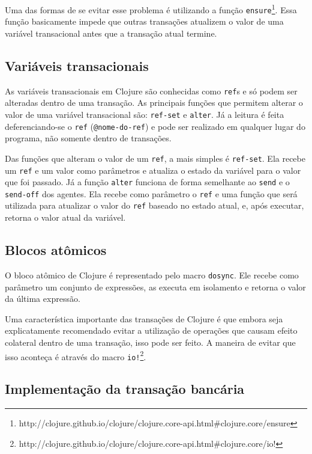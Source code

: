 Uma das formas de se evitar esse problema é utilizando a função \verb|ensure|\footnote{http://clojure.github.io/clojure/clojure.core-api.html\#clojure.core/ensure}. Essa função basicamente impede que outras transações atualizem o valor de uma variável transacional antes que a transação atual termine.


\subsection{Variáveis transacionais}

As variáveis transacionais em Clojure são conhecidas como \verb|ref|s e só podem ser alteradas dentro de uma transação. As principais funções que permitem alterar o valor de uma variável transacional são: \verb|ref-set| e \verb|alter|. Já a leitura é feita deferenciando-se o \verb|ref| (\verb|@nome-do-ref|) e pode ser realizado em qualquer lugar do programa, não somente dentro de transações.

Das funções que alteram o valor de um \verb|ref|, a mais simples é \verb|ref-set|. Ela recebe um \verb|ref| e um valor como parâmetros e atualiza o estado da variável para o valor que foi passado. Já a função \verb|alter| funciona de forma semelhante ao \verb|send| e o \verb|send-off| dos agentes. Ela recebe como parâmetro o \verb|ref| e uma função que será utilizada para atualizar o valor do \verb|ref| baseado no estado atual, e, após executar, retorna o valor atual da variável. 

\subsection{Blocos atômicos}

O bloco atômico de Clojure é representado pelo macro \verb|dosync|. Ele recebe como parâmetro um conjunto de expressões, as executa em isolamento e retorna o valor da última expressão.

Uma característica importante das transações de Clojure é que embora seja explicatamente recomendado evitar a utilização de operações que causam efeito colateral dentro de uma transação, isso pode ser feito. A maneira de evitar que isso aconteça é através do macro \verb|io!|\footnote{http://clojure.github.io/clojure/clojure.core-api.html\#clojure.core/io!}.

\subsection{Implementação da transação bancária}

